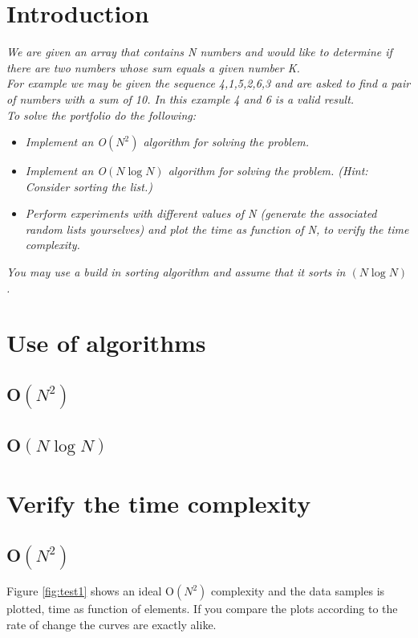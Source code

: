 \section{Introduction}
\emph{We are given an array that contains N numbers and would like to determine if there are two numbers whose sum equals a given number K.\\
For example we may be given the sequence 4,1,5,2,6,3 and are asked to find a pair of numbers with a sum of 10. In this example 4 and 6 is a valid result.\\
To solve the portfolio do the following:}
\begin{itemize}
\item \emph{Implement an O\(\left( { N }^{ 2 } \right)\) algorithm for solving the problem.}
\item \emph{Implement an O\(\left( N\log {N }  \right) \) algorithm for solving the problem. (Hint: Consider sorting the list.)}
\item \emph{Perform experiments with different values of \textit{N} (generate the associated random lists yourselves)
and plot the time as function of \textit{N}, to verify the time complexity.}
\end{itemize}
\emph{You may use a build in sorting algorithm and assume that it sorts in \(\left( N\log {N }  \right) \).}

\section{Use of algorithms}
\subsection{O\(\left( { N }^{ 2 } \right)\)}
\subsection{O\(\left( N\log {N }  \right) \)}


\newpage
\section{Verify the time complexity}

\subsection{O\(\left( { N }^{ 2 } \right)\)}
Figure \ref{fig:test1} shows an ideal O\(\left( { N }^{ 2 } \right)\) complexity and the data samples is plotted, time as function of elements. If you compare the plots according to the rate of change the curves are exactly alike. 


